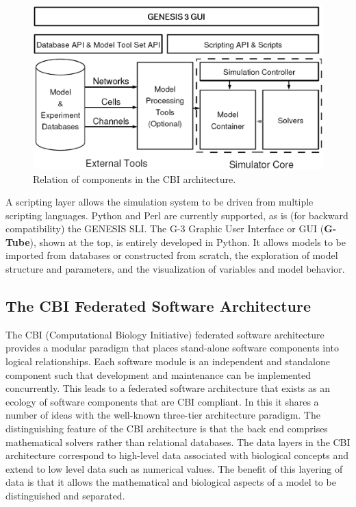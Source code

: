 \documentclass[12pt]{article}
\begin{document}
\begin{figure}[ht]
  \centering
    \includegraphics[scale=0.4]{figures/G3arch.eps}
  \caption{Relation of components in the CBI architecture.}
  \label{fig:cbi-arch}
\end{figure}

A scripting layer allows the simulation system to be driven from
multiple scripting languages. Python and Perl are currently supported, as is (for backward compatibility) the GENESIS SLI. The G-3 Graphic User Interface or GUI ({\bf G-Tube}), shown at the top,
is entirely developed in Python.  It allows models to be imported from
databases or constructed from scratch, the exploration of model
structure and parameters, and the visualization of variables and model
behavior.

\subsection{The CBI Federated Software Architecture}
The CBI (Computational Biology Initiative) federated software architecture
provides a modular paradigm that places stand-alone software
components into logical relationships. Each software module is an independent and standalone component such that development and maintenance can be implemented concurrently. This leads to a federated software architecture that exists as an ecology of software components that are CBI compliant. In this it shares a number of
ideas with the well-known three-tier architecture paradigm.  The
distinguishing feature of the CBI architecture is that the back end
comprises mathematical solvers rather than relational databases.  The
data layers in the CBI architecture correspond to high-level data
associated with biological concepts and extend to low level data such
as numerical values. The benefit of this layering of data is that it
allows the mathematical and biological aspects of a model to be
distinguished and separated.
\end{document}
